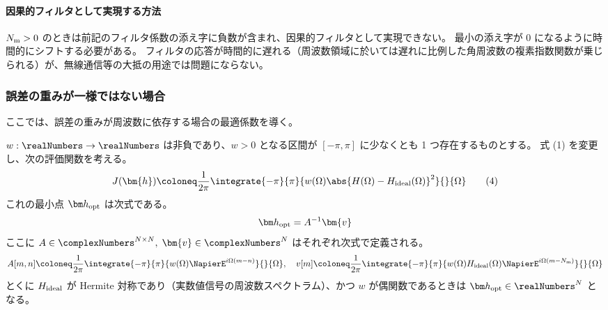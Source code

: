            \paragraph{因果的フィルタとして実現する方法}
                ${N_\text{m}}>0$ のときは前記のフィルタ係数の添え字に負数が含まれ、因果的フィルタとして実現できない。
                最小の添え字が 0 になるように時間的にシフトする必要がある。
                フィルタの応答が時間的に遅れる（周波数領域に於いては遅れに比例した角周波数の複素指数関数が乗じられる）が、無線通信等の大抵の用途では問題にならない。
        \subsubsection{誤差の重みが一様ではない場合}
            ここでは、誤差の重みが周波数に依存する場合の最適係数を導く。
            \begin{shadebox}
                $w:\realNumbers\to\realNumbers$ は非負であり、$w>0$ となる区間が $[-\pi,\pi]$ に少なくとも 1 つ存在するものとする。
                式 (1) を変更し、次の評価関数を考える。
                \[ J(\bm{h}) \coloneq \frac{1}{2\pi}\integrate{-\pi}{\pi}{w(\Omega)\abs{H(\Omega)-\Hideal(\Omega)}^2}{}{\Omega}\tag{4} \]
                これの最小点 $\vhOpt$ は次式である。
                \[ \vhOpt = A^{-1}\bm{v} \]
                ここに $A\in\complexNumbers^{N\times N},\;\bm{v}\in\complexNumbers^N$ はそれぞれ次式で定義される。
                \[ A[m,n] \coloneq \frac{1}{2\pi}\integrate{-\pi}{\pi}{w(\Omega)\NapierE^{i\Omega(m-n)}}{}{\Omega},\quad v[m] \coloneq \frac{1}{2\pi}\integrate{-\pi}{\pi}{w(\Omega)\Hideal(\Omega)\NapierE^{i\Omega (m-\Nm)}}{}{\Omega} \]
                とくに $H_\text{ideal}$ が Hermite 対称であり（実数値信号の周波数スペクトラム）、かつ $w$ が偶関数であるときは $\vhOpt\in\realNumbers^N$ となる。
            \end{shadebox}
